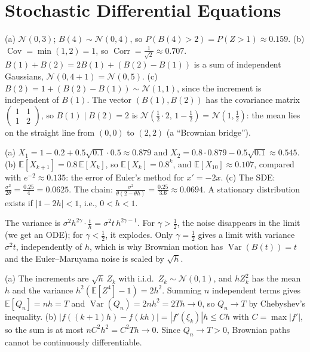 \documentclass[11pt]{article}
\newcommand{\E}{\mathbb{E}}
\DeclareMathOperator{\Var}{Var}
\DeclareMathOperator{\Cov}{Cov}
\DeclareMathOperator{\Corr}{Corr}
\begin{document}
\section*{Stochastic Differential Equations}

\begin{description}[leftmargin=0pt, itemsep=0.3em]
    \item[\ref{pr:brownian}.] (a) $\mathcal{N}(0, 3)$; $B(4) \sim \mathcal{N}(0, 4)$, so $P(B(4) > 2) = P(Z > 1) \approx 0.159$. (b) $\Cov = \min(1, 2) = 1$, so $\Corr = \frac{1}{\sqrt{2}} \approx 0.707$. $B(1) + B(2) = 2B(1) + (B(2) - B(1))$ is a sum of independent Gaussians, $\mathcal{N}(0, 4 + 1) = \mathcal{N}(0, 5)$. (c) $B(2) = 1 + (B(2) - B(1)) \sim \mathcal{N}(1, 1)$, since the increment is independent of $B(1)$. The vector $(B(1), B(2))$ has the covariance matrix $\left(\begin{smallmatrix} 1 & 1 \\ 1 & 2 \end{smallmatrix}\right)$, so $B(1) \mid B(2) = 2$ is $\mathcal{N}(\frac{1}{2} \cdot 2, \, 1 - \frac{1}{2}) = \mathcal{N}(1, \frac{1}{2})$: the mean lies on the straight line from $(0, 0)$ to $(2, 2)$ (a ``Brownian bridge'').
    \item[\ref{pr:euler-maruyama}.] (a) $X_1 = 1 - 0.2 + 0.5\sqrt{0.1} \cdot 0.5 \approx 0.879$ and $X_2 = 0.8 \cdot 0.879 - 0.5\sqrt{0.1} \approx 0.545$. (b) $\E[X_{k+1}] = 0.8\,\E[X_k]$, so $\E[X_k] = 0.8^k$, and $\E[X_{10}] \approx 0.107$, compared with $e^{-2} \approx 0.135$: the error of Euler's method for $x' = -2x$. (c) The SDE: $\frac{\sigma^2}{2\theta} = \frac{0.25}{4} = 0.0625$. The chain: $\frac{\sigma^2}{\theta(2 - \theta h)} = \frac{0.25}{3.6} \approx 0.0694$. A stationary distribution exists if $|1 - 2h| < 1$, i.e., $0 < h < 1$.
    \item[\ref{pr:sqrt-h}.] The variance is $\sigma^2h^{2\gamma} \cdot \frac{t}{h} = \sigma^2t\,h^{2\gamma - 1}$. For $\gamma > \frac{1}{2}$, the noise disappears in the limit (we get an ODE); for $\gamma < \frac{1}{2}$, it explodes. Only $\gamma = \frac{1}{2}$ gives a limit with variance $\sigma^2t$, independently of $h$, which is why Brownian motion has $\Var(B(t)) = t$ and the Euler--Maruyama noise is scaled by $\sqrt{h}$.
    \item[\ref{pr:quadratic-variation}.] (a) The increments are $\sqrt{h}\,Z_k$ with i.i.d.\ $Z_k \sim \mathcal{N}(0, 1)$, and $hZ_k^2$ has the mean $h$ and the variance $h^2(\E[Z^4] - 1) = 2h^2$. Summing $n$ independent terms gives $\E[Q_n] = nh = T$ and $\Var(Q_n) = 2nh^2 = 2Th \to 0$, so $Q_n \to T$ by Chebyshev's inequality. (b) $|f((k + 1)h) - f(kh)| = |f'(\xi_k)|h \leq Ch$ with $C = \max|f'|$, so the sum is at most $nC^2h^2 = C^2Th \to 0$. Since $Q_n \to T > 0$, Brownian paths cannot be continuously differentiable.

\end{description}
\end{document}
